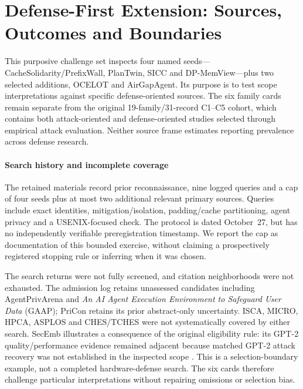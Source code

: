 \section{Defense-First Extension: Sources, Outcomes and Boundaries}\label{sec:r42-defense-first}
This purposive challenge set inspects four named seeds---CacheSolidarity/PrefixWall, PlanTwin, SICC and DP-MemView---plus two selected additions, OCELOT and AirGapAgent. Its purpose is to test scope interpretations against specific defense-oriented sources. The six family cards remain separate from the original 19-family/31-record C1--C5 cohort, which contains both attack-oriented and defense-oriented studies selected through empirical attack evaluation. Neither source frame estimates reporting prevalence across defense research.

\paragraph{Search history and incomplete coverage}
The retained materials record prior reconnaissance, nine logged queries and a cap of four seeds plus at most two additional relevant primary sources. Queries include exact identities, mitigation/isolation, padding/cache partitioning, agent privacy and a USENIX-focused check. The protocol is dated October~27, but has no independently verifiable preregistration timestamp. We report the cap as documentation of this bounded exercise, without claiming a prospectively registered stopping rule or inferring when it was chosen.

The search returns were not fully screened, and citation neighborhoods were not exhausted. The admission log retains unassessed candidates including AgentPrivArena and \emph{An AI Agent Execution Environment to Safeguard User Data} (GAAP); PriCon retains its prior abstract-only uncertainty. ISCA, MICRO, HPCA, ASPLOS and CHES/TCHES were not systematically covered by either search. SecEmb illustrates a consequence of the original eligibility rule: its GPT-2 quality/performance evidence remained adjacent because matched GPT-2 attack recovery was not established in the inspected scope \cite{umar2025secemb}. This is a selection-boundary example, not a completed hardware-defense search. The six cards therefore challenge particular interpretations without repairing omissions or selection bias.

